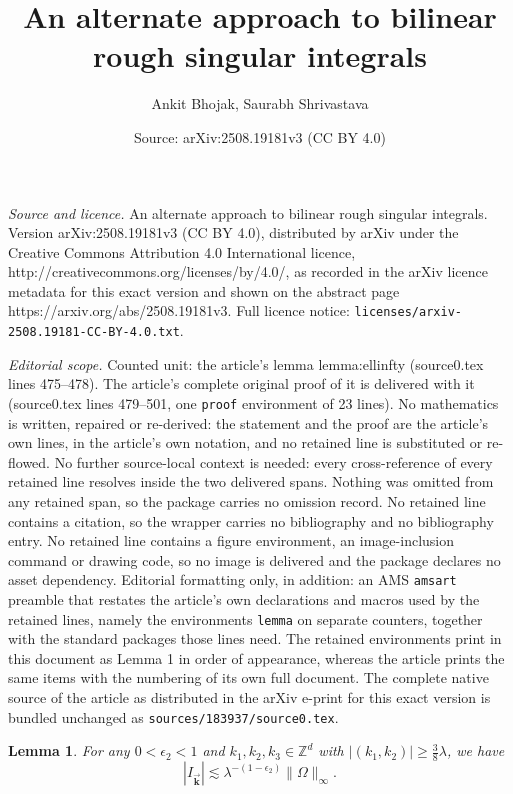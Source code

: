 \documentclass[10pt,a4paper]{amsart}
\title{An alternate approach to bilinear rough singular integrals}
\author{Ankit Bhojak, Saurabh Shrivastava}
\date{Source: arXiv:2508.19181v3 (CC BY 4.0)}
\newtheorem{lemma}{Lemma}
\newcommand{\Z}{{\mathbb Z}}
\begin{document}
\maketitle

\noindent\emph{Source and licence.} An alternate approach to bilinear rough singular integrals. Version arXiv:2508.19181v3 (CC BY 4.0), distributed by arXiv under the Creative Commons Attribution 4.0 International licence, http://creativecommons.org/licenses/by/4.0/, as recorded in the arXiv licence metadata for this exact version and shown on the abstract page https://arxiv.org/abs/2508.19181v3. Full licence notice: \texttt{licenses/arxiv-2508.19181-CC-BY-4.0.txt}.\par\smallskip

\noindent\textit{Editorial scope.} Counted unit: the article's lemma lemma:ellinfty (source0.tex lines 475--478). The article's complete original proof of it is delivered with it (source0.tex lines 479--501, one \texttt{proof} environment of 23 lines). No mathematics is written, repaired or re-derived: the statement and the proof are the article's own lines, in the article's own notation, and no retained line is substituted or re-flowed.  No further source-local context is needed: every cross-reference of every retained line resolves inside the two delivered spans.  Nothing was omitted from any retained span, so the package carries no omission record.  No retained line contains a citation, so the wrapper carries no bibliography and no bibliography entry.  No retained line contains a figure environment, an image-inclusion command or drawing code, so no image is delivered and the package declares no asset dependency.  Editorial formatting only, in addition: an AMS \texttt{amsart} preamble that restates the article's own declarations and macros used by the retained lines, namely the environments \texttt{lemma} on separate counters, together with the standard packages those lines need.  The retained environments print in this document as Lemma 1 in order of appearance, whereas the article prints the same items with the numbering of its own full document.  The complete native source of the article as distributed in the arXiv e-print for this exact version is bundled unchanged as \texttt{sources/183937/source0.tex}.
\begin{lemma}\label{lemma:ellinfty}
	For any $0<\epsilon_2<1$ and $k_1,k_2,k_3\in\Z^d$ with $|(k_1,k_2)|\geq\frac{3}{8}\lambda$, we have
	\[|I_{\vec{\mathbf{k}}}|\lesssim\lambda^{-(1-\epsilon_2)}\|\Omega\|_\infty.\]
\end{lemma}
\end{document}
